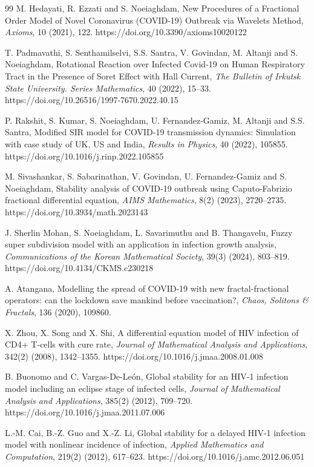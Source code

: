 \documentclass{article}
\theoremstyle{plain}
\theoremstyle{definition}
\numberwithin{equation}{section}
\begin{document}
\begin{thebibliography}{99}
M. Hedayati, R. Ezzati and S. Noeiaghdam,
New Procedures of a Fractional Order Model of Novel Coronavirus (COVID-19) Outbreak via Wavelets Method,
\textit{Axioms}, 10 (2021), 122.
https://doi.org/10.3390/axioms10020122

T. Padmavathi, S. Senthamilselvi, S.S. Santra, V. Govindan, M. Altanji and S. Noeiaghdam,
Rotational Reaction over Infected Covid-19 on Human Respiratory Tract in the Presence of Soret Effect with Hall Current,
\textit{The Bulletin of Irkutsk State University. Series Mathematics}, 40 (2022), 15--33.
https://doi.org/10.26516/1997-7670.2022.40.15

P. Rakshit, S. Kumar, S. Noeiaghdam, U. Fernandez-Gamiz, M. Altanji and S.S. Santra,
Modified SIR model for COVID-19 transmission dynamics: Simulation with case study of UK, US and India,
\textit{Results in Physics}, 40 (2022), 105855.
https://doi.org/10.1016/j.rinp.2022.105855

M. Sivashankar, S. Sabarinathan, V. Govindan, U. Fernandez-Gamiz and S. Noeiaghdam,
Stability analysis of COVID-19 outbreak using Caputo-Fabrizio fractional differential equation,
\textit{AIMS Mathematics}, 8(2) (2023), 2720--2735.
https://doi.org/10.3934/math.2023143

J. Sherlin Mohan, S. Noeiaghdam, L. Savarimuthu and B. Thangavelu,
Fuzzy super subdivision model with an application in infection growth analysis,
\textit{Communications of the Korean Mathematical Society}, 39(3) (2024), 803--819.
https://doi.org/10.4134/CKMS.c230218

A. Atangana,
Modelling the spread of COVID-19 with new fractal-fractional operators: can the lockdown save mankind before vaccination?,
\textit{Chaos, Solitons \& Fractals}, 136 (2020), 109860.




X. Zhou, X. Song and X. Shi,
A differential equation model of HIV infection of CD4+ T-cells with cure rate,
\textit{Journal of Mathematical Analysis and Applications}, 342(2) (2008), 1342--1355.
https://doi.org/10.1016/j.jmaa.2008.01.008

B. Buonomo and C. Vargas-De-León,
Global stability for an HIV-1 infection model including an eclipse stage of infected cells,
\textit{Journal of Mathematical Analysis and Applications}, 385(2) (2012), 709--720.
https://doi.org/10.1016/j.jmaa.2011.07.006

L.-M. Cai, B.-Z. Guo and X.-Z. Li,
Global stability for a delayed HIV-1 infection model with nonlinear incidence of infection,
\textit{Applied Mathematics and Computation}, 219(2) (2012), 617--623.
https://doi.org/10.1016/j.amc.2012.06.051


\end{thebibliography}
\end{document}
